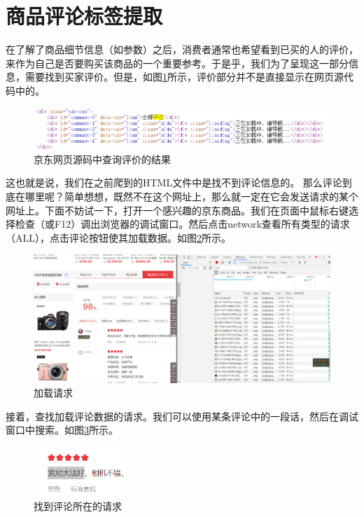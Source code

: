 \section{商品评论标签提取}
在了解了商品细节信息（如参数）之后，消费者通常也希望看到已买的人的评价，来作为自己是否要购买该商品的一个重要参考。于是乎，我们为了呈现这一部分信息，需要找到买家评价。但是，如图\ref{img:yhb1}所示，评价部分并不是直接显示在网页源代码中的。

\begin{figure}[htbp]
\centering
\includegraphics[width=13.5cm]{img/yhb/web_source_code_jd.png}
\caption{京东网页源码中查询评价的结果} %
\label{img:yhb1}   %
\end{figure}

这也就是说，我们在之前爬到的HTML文件中是找不到评论信息的。
那么评论到底在哪里呢？简单想想，既然不在这个网址上，那么就一定在它会发送请求的某个网址上。下面不妨试一下，打开一个感兴趣的京东商品。我们在页面中鼠标右键选择检查（或F12）调出浏览器的调试窗口。然后点击network查看所有类型的请求（ALL），点击评论按钮使其加载数据。如图\ref{img:yhb2}所示。

\begin{figure}[htbp]
\centering
\includegraphics[width=13.5cm]{img/yhb/network_jd.png}
\caption{加载请求} %
\label{img:yhb2}   %
\end{figure}

接着，查找加载评论数据的请求。我们可以使用某条评论中的一段话，然后在调试窗口中搜索。如图\ref{img:yhb3}所示。
\begin{figure}[htbp]
\centering
\includegraphics[width=3.5cm]{img/yhb/find_request_jd.png}
\caption{找到评论所在的请求} %
\label{img:yhb3}   %
\end{figure}

